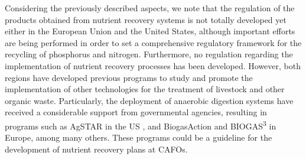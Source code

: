 \begin{refsection}[referencesCh1]
Considering the previously described aspects, we note that the regulation of the products obtained from nutrient recovery systems is not totally developed yet either in the European Union and the United States, although important efforts are being performed in order to set a comprehensive regulatory framework for the recycling of phosphorus and nitrogen. Furthermore, no regulation regarding the implementation of nutrient recovery processes has been developed.
However, both regions have developed previous programs to study and promote the implementation of other technologies for the treatment of livestock and other organic waste. Particularly, the deployment of anaerobic digestion systems have received a considerable support from governmental agencies, resulting in programs such as AgSTAR in the US \citep{AgSTARProgram}, and BiogasAction \citep{BiogasAction} and BIOGAS\textsuperscript{3} \citep{BIOGAS3PROJECT} in Europe, among many others. These programs could be a guideline for the development of nutrient recovery plans at CAFOs.

%



\end{refsection}
